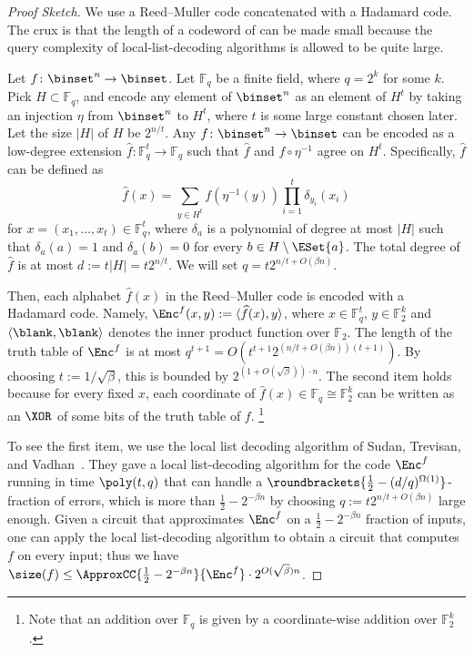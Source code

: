 \documentclass{toc}
\begin{document}
\begin{proof}
  [Proof Sketch]
  We use a Reed--Muller code concatenated with a Hadamard code.
  The crux is that the length of a codeword of can be made small because the query complexity of local-list-decoding algorithms is allowed to be quite large.

  Let $f \colon \binset^n \to \binset$.
  Let $\mathbb{F}_{q}$ be a finite field, where $q = 2^k$ for some $k$.
  Pick $H \subset \mathbb{F}_q$, and encode any element of $\binset^n$ as an element of $H^t$
  by taking an injection $\eta$ from $\binset^n$ to $H^t$,
  where $t$ is some large constant chosen later.
  Let the size $|H|$ of $H$ be $2^{n/t}$.
  Any $f \colon \binset^n \to \binset$ can be
  encoded as a low-degree extension $\widehat{f} \colon \mathbb{F}_q^t \to \mathbb{F}_q$
  such that $\widehat{f}$ and $f \circ \eta^{-1}$ agree on $H^t$.
  Specifically, $\widehat{f}$ can be defined as
  \[
    \widehat{f}(x) = \sum_{y \in H^t} f(\eta^{-1}(y)) \prod_{i=1}^t \delta_{y_i} (x_i)
  \]
  for $x = (x_1, \ldots, x_t) \in \mathbb{F}_q^t$,
  where $\delta_a$ is a polynomial of degree at most $|H|$ such that $\delta_a(a) = 1$ and $\delta_a(b) = 0$ for every $b \in H \setminus \ESet{a}$.
  The total degree of $\widehat{f}$ is at most $d := t |H| = t 2^{n / t}$.
  We will set $q = t 2^{n / t + O(\beta n)}$.

  Then, each alphabet $\widehat{f}(x)$ in the Reed--Muller code is encoded with a Hadamard code.
  Namely, $\Enc^f(x, y) := \langle \widehat{f}(x), y \rangle$,
  where $x \in \mathbb{F}_{q}^t $, $y \in \mathbb{F}_2^k$ and $\langle \blank, \blank \rangle$ denotes the inner product function over $\mathbb F_2$.
  The length of the truth table of $\Enc^f$
  is at most $q^{t + 1} = O(t^{t + 1} 2^{(n / t + O(\beta n))(t + 1)})$.
  By choosing $t := 1 / \sqrt{\beta}$, this is bounded by $2^{(1 + O(\sqrt{\beta})) \cdot n}$.
  The second item holds because
  for every fixed $x$,
  each coordinate of $\widehat{f}(x) \in \mathbb{F}_q \cong \mathbb{F}_2^k$
  can be written as an $\XOR$ of some bits of the truth table of $f$.%
  \footnote{Note that an addition over $\mathbb{F}_q$ is given by a coordinate-wise addition over $\mathbb{F}_2^k$.}

  To see the first item, we use the local list decoding algorithm of
  Sudan, Trevisan, and Vadhan~\cite{SudanTV01_jcss_journals}.
  They gave a local list-decoding algorithm for
  the code $\Enc^f$
  running in time $\poly(t, q)$
  that can handle a $\roundbrackets{\frac{1}{2} - (d / q)^{\Omega(1)}}$-fraction of errors,
  which is more than $\frac{1}{2} - 2^{- \beta n}$
  by choosing $q := t 2^{n / t + O(\beta n)}$ large enough.
  Given a circuit that approximates $\Enc^f$ on a $\frac{1}{2} - 2^{- \beta n}$ fraction of inputs,
  one can apply the local list-decoding algorithm to obtain a circuit that computes $f$ on every input;
  thus we have $\size(f) \le \ApproxCC{\frac{1}{2} - 2^{- \beta n}}{\Enc^f} \cdot 2^{O(\sqrt{\beta}) n}$.
\end{proof}
\end{document}
